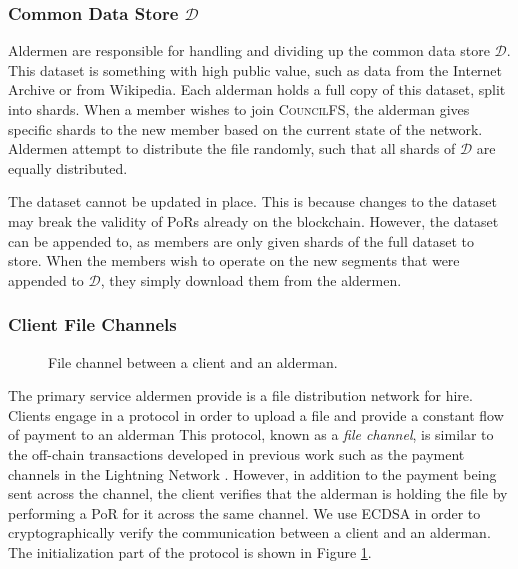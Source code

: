 \documentclass{article}
\begin{document}
\subsubsection{Common Data Store $\mathcal{D}$}

Aldermen are responsible for handling and dividing up the common data store
$\mathcal{D}$. This dataset is something with high public value, such as data
from the Internet Archive or from Wikipedia. Each alderman holds a full copy of
this dataset, split into shards. When a member wishes to join
\textsc{CouncilFS}, the alderman gives specific shards to the new member based
on the current state of the network. Aldermen attempt to distribute the file
randomly, such that all shards of $\mathcal{D}$ are equally distributed.

The dataset cannot be updated in place. This is because changes to the dataset
may break the validity of PoRs already on the blockchain. However, the dataset
can be appended to, as members are only given shards of the full dataset to
store. When the members wish to operate on the new segments that were appended
to $\mathcal{D}$, they simply download them from the aldermen.

\subsubsection{Client File Channels}

\begin{figure}[t]
  \centering
  \fbox{\rule[-.5cm]{4cm}{4cm} \rule[-.5cm]{4cm}{0cm}}
  \caption{File channel between a client and an alderman.}
  \label{fig:channel}
\end{figure}

The primary service aldermen provide is a file distribution network for hire.
Clients engage in a protocol in order to upload a file and provide a constant
flow of payment to an alderman This
protocol, known as a \emph{file channel}, is similar to the off-chain
transactions developed in previous work such as the payment channels in the
Lightning Network \cite{lightning}. However, in addition to the payment being
sent across the channel, the client verifies that the alderman is holding the
file by performing a PoR for it across the same channel. We use ECDSA in order
to cryptographically verify the communication between a client and an alderman.
The initialization part of the protocol is shown in Figure \ref{fig:channel}.
\end{document}
